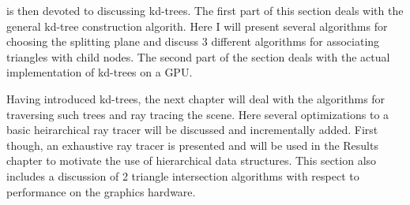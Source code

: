  is then devoted to discussing kd-trees. The
first part of this section deals with the general kd-tree construction
algorith. Here I will present several algorithms for choosing the
splitting plane and discuss 3 different algorithms for associating
triangles with child nodes. The second part of the section deals with
the actual implementation of kd-trees on a GPU.


Having introduced kd-trees, the next chapter will deal with the
algorithms for traversing such trees and ray tracing the scene. Here
several optimizations to a basic heirarchical ray tracer will be
discussed and incrementally added. First though, an exhaustive ray
tracer is presented and will be used in the Results chapter to
motivate the use of hierarchical data structures. This section also
includes a discussion of 2 triangle intersection algorithms with
respect to performance on the graphics hardware.



